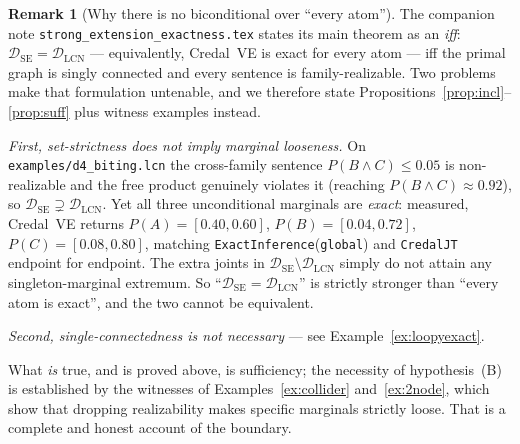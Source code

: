 \documentclass[11pt]{article}
\theoremstyle{definition}
\newtheorem{remark}{Remark}
\newcommand{\DSE}{\mathcal{D}_{\mathrm{SE}}}
\newcommand{\DLCN}{\mathcal{D}_{\mathrm{LCN}}}
\begin{document}
\begin{remark}[Why there is no biconditional over ``every atom'']\label{rem:nobiconditional}
The companion note \texttt{strong\_extension\_\allowbreak exactness.tex} states its main theorem
as an \emph{iff}: $\DSE=\DLCN$ --- equivalently, Credal~VE is exact for every atom --- iff the primal
graph is singly connected and every sentence is family-realizable. Two problems make that
formulation untenable, and we therefore state Propositions~\ref{prop:incl}--\ref{prop:suff} plus
witness examples instead.

\emph{First, set-strictness does not imply marginal looseness.} On \texttt{examples/d4\_biting.lcn}
the cross-family sentence $P(B\wedge C)\le0.05$ is non-realizable and the free product genuinely
violates it (reaching $P(B\wedge C)\approx0.92$), so $\DSE\supsetneq\DLCN$. Yet all three
unconditional marginals are \emph{exact}: measured, Credal~VE returns
$P(A)=[0.40,0.60]$, $P(B)=[0.04,0.72]$, $P(C)=[0.08,0.80]$, matching
\texttt{ExactInference}(\texttt{global}) and \texttt{CredalJT} endpoint for endpoint. The extra
joints in $\DSE\setminus\DLCN$ simply do not attain any singleton-marginal extremum. So
``$\DSE=\DLCN$'' is strictly stronger than ``every atom is exact'', and the two cannot be equivalent.

\emph{Second, single-connectedness is not necessary} --- see Example~\ref{ex:loopyexact}.

What \emph{is} true, and is proved above, is sufficiency; the necessity of hypothesis~(B) is
established by the witnesses of Examples~\ref{ex:collider} and~\ref{ex:2node}, which show that
dropping realizability makes specific marginals strictly loose. That is a complete and honest account
of the boundary.
\end{remark}
\end{document}
